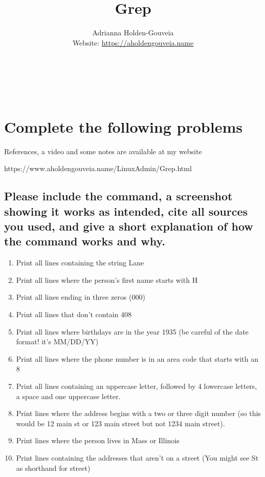 \documentclass[12pt]{article}
\title{Grep}
\author{
        Adrianna Holden-Gouveia \\
        Website: \url{https://aholdengouveia.name}\\
        \date{\vspace{-5ex}} 
        \faLinkedin{: aholdengouveia} \\
        \faGithub {: aholdengouveia} \\
        \faTwitter {: aholdengouveia} \\
        }
\begin{document}
    

\maketitle


\section*{Complete the following problems}

References, a video and some notes are available at my website

https://www.aholdengouveia.name/LinuxAdmin/Grep.html

\subsection*{Please include the command, a screenshot showing it works as intended, cite all sources you used, and give a short explanation of how the command works and why.}
    \begin{enumerate}
        \item Print all lines containing the string Lane
        \item Print all lines where the person's first name starts with H
        \item Print all lines ending in three zeros (000)
        \item Print all lines that don't contain 408
        \item Print all lines where birthdays are in the year 1935 (be careful of the date format! it's MM/DD/YY)
        \item Print all lines where the phone number is in an area code that starts with an 8
        \item Print all lines containing an uppercase letter, followed by 4 lowercase letters, a space and one uppercase letter.
        \item Print lines where the address begins with a two or three digit number (so this would be 12 main st or 123 main street but not 1234 main street).
        \item Print lines where the person lives in Mass or Illinois
        \item Print lines containing the addresses that aren't on a street (You might see St as shorthand for street)


    \end{enumerate}
\end{document}
